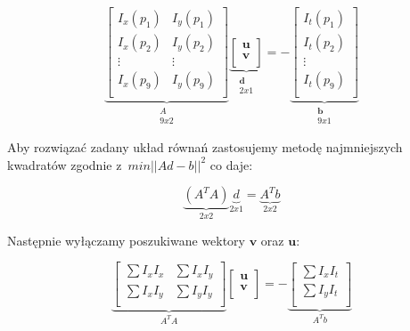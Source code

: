     \[
      \underbrace{
        \begin{bmatrix}
          I_{x}(p_{1}) & I_{y}(p_{1}) \\
          I_{x}(p_{2}) & I_{y}(p_{2}) \\
          \vdots       & \vdots       \\
          I_{x}(p_{9}) & I_{y}(p_{9}) \\
        \end{bmatrix}}_{\substack{A\\9x2}}
      \underbrace{
        \begin{bmatrix}
          \mathbf{u} \\
          \mathbf{v} \\
        \end{bmatrix}}_{\substack{\mathbf{d}\\2x1}} =
      -\underbrace{
        \begin{bmatrix}
          I_{t}(p_{1}) \\
          I_{t}(p_{2}) \\
          \vdots       \\
          I_{t}(p_{9}) \\
        \end{bmatrix}}_{\substack{\mathbf{b}\\9x1}}
    \]

    Aby rozwiązać zadany układ równań zastosujemy metodę najmniejszych kwadratów zgodnie z~$min||Ad - b||^{2}$ co daje:

    \[
      \underbrace{(A^{T}A)}_{2x2} \underbrace{d}_{2x1} = \underbrace{A^{T}b}_{2x2}
    \]

    Następnie wyłączamy poszukiwane wektory $\mathbf{v}$ oraz $\mathbf{u}$:

    \[
      \underbrace{
        \begin{bmatrix}
          \sum I_{x} I_{x} & \sum I_{x} I_{y} \\
          \sum I_{x} I_{y} & \sum I_{y} I_{y} \\
        \end{bmatrix}
      }_{A^{T}A}
      \begin{bmatrix}
        \mathbf{u} \\
        \mathbf{v} \\
      \end{bmatrix} =
      -\underbrace{
        \begin{bmatrix}
          \sum I_{x} I_{t} \\
          \sum I_{y} I_{t} \\
        \end{bmatrix}
      }_{A^{T}b}
    \]

